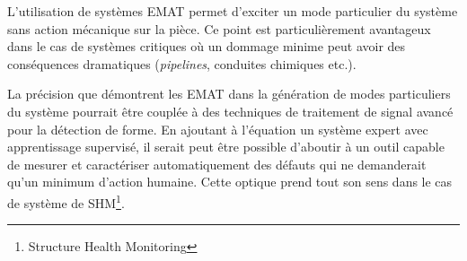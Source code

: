 L'utilisation de systèmes EMAT permet d'exciter un mode particulier du système sans action mécanique sur la pièce. Ce point est particulièrement avantageux dans le cas de systèmes critiques où un dommage minime peut avoir des conséquences dramatiques (\textit{pipelines}, conduites chimiques etc.).

La précision que démontrent les EMAT dans la génération de modes particuliers du système pourrait être couplée à des techniques de traitement de signal avancé pour la détection de forme. En ajoutant à l'équation un système expert avec apprentissage supervisé, il serait peut être possible d'aboutir à un outil capable de mesurer et caractériser automatiquement des défauts qui ne demanderait qu'un minimum d'action humaine.
Cette optique prend tout son sens dans le cas de système de SHM\footnote{Structure Health Monitoring}.
